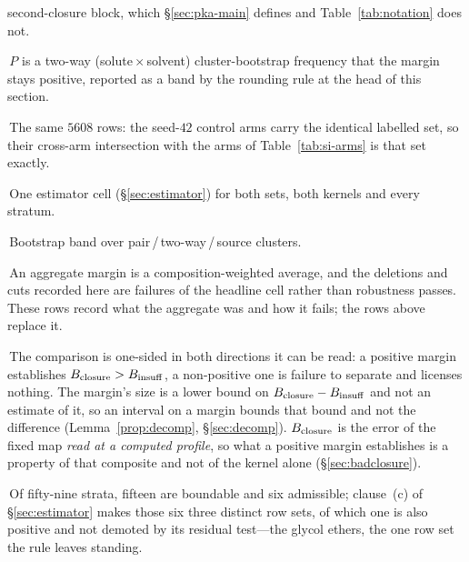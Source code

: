 \begin{table}[tp]
{{second-closure block, which \S\ref{sec:pka-main} defines and Table~\ref{tab:notation} does not.\par
{}\,$P$ is a two-way (solute\,$\times$\,solvent) cluster-bootstrap frequency that the margin
stays positive, reported as a band by the rounding rule at the head of this section.\par
{}\,The same $5608$ rows: the seed-$42$ control arms carry the identical labelled set, so
their cross-arm intersection with the arms of Table~\ref{tab:si-arms} is that set exactly.\par
{}\,One estimator cell (\S\ref{sec:estimator}) for both sets, both kernels and every
stratum.\par
{}\,Bootstrap band over pair\,/\,two-way\,/\,source clusters.\par
{}\,An aggregate margin is a composition-weighted average, and the deletions and cuts recorded
here are failures of the headline cell rather than robustness passes. These rows record what the
aggregate was and how it fails; the rows above replace it.\par
{}\,The comparison is one-sided in both directions it can be read: a positive margin establishes
$B_{\mathrm{closure}}>B_{\mathrm{insuff}}$, a non-positive one is failure to separate and licenses nothing. The margin's size
is a lower bound on $B_{\mathrm{closure}}-B_{\mathrm{insuff}}$ and not an estimate of it, so an interval on a margin bounds
that bound and not the difference (Lemma~\ref{prop:decomp}, \S\ref{sec:decomp}). $B_{\mathrm{closure}}$ is the
error of the fixed map \emph{read at a computed profile}, so what a positive margin establishes is a
property of that composite and not of the kernel alone (\S\ref{sec:badclosure}).\par
{}\,Of fifty-nine strata, fifteen are boundable and six admissible; clause~(c) of
\S\ref{sec:estimator} makes those six three distinct row sets, of which one is also positive and not
demoted by its residual test---the glycol ethers, the one row set the rule leaves standing.}}
\end{table}

